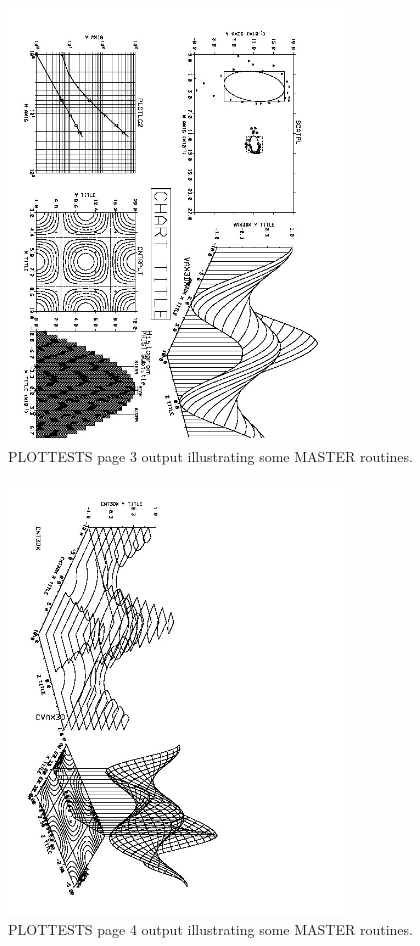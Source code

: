 \documentclass[11pt]{report}
\begin{document}
\begin{figure}[htb]
\centering
\includegraphics[width=3.5in,angle=90,origin=c]{figures/plottests2.jpg}
\vspace{-.5in}
\caption{PLOTTESTS page 3 output illustrating some MASTER routines.
\label{fig:plottests2}} 
\end{figure}

\begin{figure}[htb]
\centering
\includegraphics[width=3.5in,angle=90,origin=c]{figures/plottests3.jpg}
\vspace{-.5in}
\caption{PLOTTESTS page 4 output illustrating some MASTER routines.
\label{fig:plottests3}} 
\end{figure}
\clearpage
\end{document}
